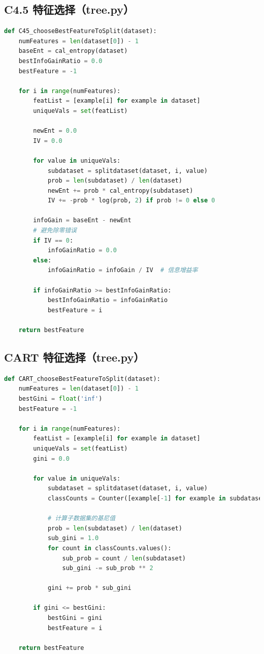 \documentclass[UTF8]{ctexart}
\begin{document}
\subsection{C4.5 特征选择（tree.py）}
\begin{lstlisting}[language=Python, caption=C4.5 算法的特征选择]
def C45_chooseBestFeatureToSplit(dataset):
    numFeatures = len(dataset[0]) - 1
    baseEnt = cal_entropy(dataset)
    bestInfoGainRatio = 0.0
    bestFeature = -1
    
    for i in range(numFeatures):
        featList = [example[i] for example in dataset]
        uniqueVals = set(featList)
        
        newEnt = 0.0
        IV = 0.0
        
        for value in uniqueVals:
            subdataset = splitdataset(dataset, i, value)
            prob = len(subdataset) / len(dataset)
            newEnt += prob * cal_entropy(subdataset)
            IV += -prob * log(prob, 2) if prob != 0 else 0
        
        infoGain = baseEnt - newEnt
        # 避免除零错误
        if IV == 0:
            infoGainRatio = 0.0
        else:
            infoGainRatio = infoGain / IV  # 信息增益率
        
        if infoGainRatio >= bestInfoGainRatio:
            bestInfoGainRatio = infoGainRatio
            bestFeature = i
    
    return bestFeature
\end{lstlisting}

\subsection{CART 特征选择（tree.py）}
\begin{lstlisting}[language=Python, caption=CART 算法的特征选择]
def CART_chooseBestFeatureToSplit(dataset):
    numFeatures = len(dataset[0]) - 1
    bestGini = float('inf')
    bestFeature = -1
    
    for i in range(numFeatures):
        featList = [example[i] for example in dataset]
        uniqueVals = set(featList)
        gini = 0.0
        
        for value in uniqueVals:
            subdataset = splitdataset(dataset, i, value)
            classCounts = Counter([example[-1] for example in subdataset])
            
            # 计算子数据集的基尼值
            prob = len(subdataset) / len(dataset)
            sub_gini = 1.0
            for count in classCounts.values():
                sub_prob = count / len(subdataset)
                sub_gini -= sub_prob ** 2
            
            gini += prob * sub_gini
        
        if gini <= bestGini:
            bestGini = gini
            bestFeature = i
    
    return bestFeature
\end{lstlisting}
\end{document}
